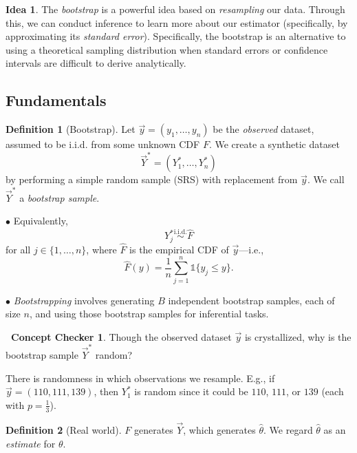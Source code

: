 \documentclass[12pt,oneside]{article}
\newcommand{\simiid}{\overset{\text{i.i.d.}}{\sim}}
\newcommand{\indic}{\mathds{1}}
\theoremstyle{definition}
\newtheorem{definition}{Definition}
\newtheorem{concept}{\faPen \ Concept Checker}
\newtheorem*{idea}{Idea}
\theoremstyle{remark}
\begin{document}
\begin{idea}
The \textit{bootstrap} is a powerful idea based on \textit{resampling} our data. Through this, we can conduct inference to learn more about our estimator (specifically, by approximating its \textit{standard error}). Specifically, the bootstrap is an alternative to using a theoretical sampling distribution when standard errors or confidence intervals are difficult to derive analytically.
\end{idea}

\subsection{Fundamentals}

\begin{definition}[Bootstrap]
Let $\vec{y} = (y_1, \ldots, y_n)$ be the \textit{observed} dataset, assumed to be i.i.d. from some unknown CDF $F$. We create a synthetic dataset \[\vec{Y}^* = (Y^*_1, \ldots, Y^*_n)\] by performing a simple random sample (SRS) with replacement from $\vec{y}$. We call $\vec{Y}^*$ a \textit{bootstrap sample}.

$\bullet$ Equivalently, \[Y^*_j \simiid \hat{F}\] for all $j \in \{1, \ldots, n\}$, where $\hat{F}$ is the empirical CDF of $\vec{y}$—i.e., \[\hat{F}(y) = \frac{1}{n} \sum_{j = 1}^{n} \indic\{y_j \leq y\}.\]

$\bullet$ \textit{Bootstrapping} involves generating $B$ independent bootstrap samples, each of size $n$, and using those bootstrap samples for inferential tasks.
\end{definition}

\begin{concept}
Though the observed dataset $\vec{y}$ is crystallized, why is the bootstrap sample $\vec{Y}^*$ random?
\end{concept}

\begin{solutionbox}
There is randomness in which observations we resample. E.g., if $\vec{y} = (110, 111, 139)$, then $Y^*_1$ is random since it could be $110$, $111$, or $139$ (each with $p = \frac{1}{3}$).
\end{solutionbox}

\begin{definition}[Real world]
$F$ generates $\vec{Y}$, which generates $\hat{\theta}$. We regard $\hat{\theta}$ as an \textit{estimate} for $\theta$.
\end{definition}
\end{document}
